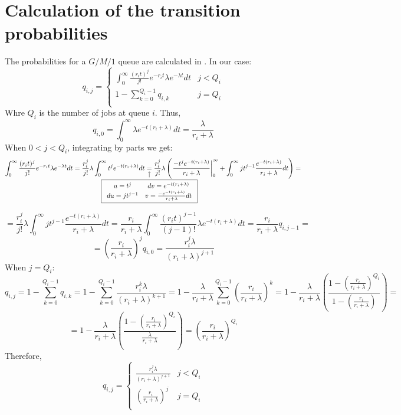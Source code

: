 \documentclass[a4paper,11pt]{article}
\newcommand{\nota}[3][2ex]{
    \underset{\mathclap{
        \begin{tikzpicture}
          \draw[->] (0, 0) to ++(0,#1);
          \node[below] at (0,0) {#3};
        \end{tikzpicture}}}{#2}
}
\begin{document}
\section*{Calculation of the transition probabilities}
The probabilities for a $G/M/1$ queue are calculated in \cite{ivo}. In our case:
$$
q_{i,j} = 
\left\{\begin{array}{ll}
    \displaystyle \int_0^\infty \frac{(r_i t)^j}{j!} e^{-r_i t} \lambda e^{-\lambda t} dt & j < Q_i \\
    \displaystyle 1- \sum_{k=0}^{Q_i -1} q_{i,k} & j = Q_i \\
\end{array}\right.
$$
Whre $Q_i$ is the number of jobs at queue $i$. Thus,
$$
q_{i,0} = \int_0^\infty \lambda e^{-t(r_i + \lambda)} dt
=
\frac{\lambda}{r_i + \lambda}
$$
When $0<j<Q_i$, integrating by parts we get:
$$
\int_0^\infty \frac{(r_i t)^j}{j!} e^{-r_i t} \lambda e^{-\lambda t} dt
=
\frac{r_i^j}{j!} \lambda \int_0^\infty t^j e^{-t(r_i + \lambda)} dt
\nota{=}{$\boxed{\begin{array}{cc}
    u = t^j & dv = e^{-t(r_i+\lambda)} \\
    du = jt^{j-1} & v = \frac{- e^{-t(r_i+\lambda)}}{r_i+\lambda} dt \\
\end{array}}$}
\frac{r_i^j}{j!} \lambda \left( \left. \frac{-t^j e^{-t(r_i+\lambda)}}{r_i+\lambda} \right|_0^\infty + \int_0^\infty jt^{j-1} \frac{e^{-t(r_i+\lambda)}}{r_i+\lambda} dt \right) = 
$$
$$
=
\frac{r_i^j}{j!} \lambda \int_0^\infty jt^{j-1} \frac{e^{-t(r_i+\lambda)}}{r_i+\lambda} dt
=
\frac{r_i}{r_i + \lambda} \int_0^\infty \frac{(r_i t)^{j-1}}{(j-1)!} \lambda e^{-t(r_i + \lambda)} dt
=
\frac{r_i}{r_i + \lambda} q_{i,j-1}
=
$$
$$
=
\left( \frac{r_i}{r_i + \lambda} \right)^j q_{i,0}
=
\frac{r_i^j \lambda}{(r_i + \lambda)^{j+1}}
$$
When $j = Q_i$:
$$
q_{i, j}
=
1 - \sum_{k=0}^{Q_i -1} q_{i,k}
=
1 - \sum_{k=0}^{Q_i -1} \frac{r_i^k \lambda}{(r_i + \lambda)^{k+1}}
=
1 - \frac{\lambda}{r_i + \lambda} \sum_{k=0}^{Q_i -1} \left( \frac{r_i}{r_i + \lambda} \right)^k
=
1 - \frac{\lambda}{r_i + \lambda} \left( \frac{1- \left( \frac{r_i}{r_i + \lambda} \right)^{Q_i} }{1-\left( \frac{r_i}{r_i + \lambda} \right)} \right)
=
$$
$$
=
1 - \frac{\lambda}{r_i + \lambda} \left( \frac{1- \left( \frac{r_i}{r_i + \lambda} \right)^{Q_i}}{\frac{\lambda}{r_i + \lambda}} \right)
=
\left( \frac{r_i}{r_i + \lambda} \right)^{Q_i}
$$
Therefore,
$$
q_{i,j} = 
\left\{\begin{array}{ll}
    \displaystyle \frac{r_i^j \lambda}{(r_i + \lambda)^{j+1}} & j < Q_i \\
    \displaystyle \left( \frac{r_i}{r_i + \lambda} \right)^j & j = Q_i \\
\end{array}\right.
$$
\end{document}
